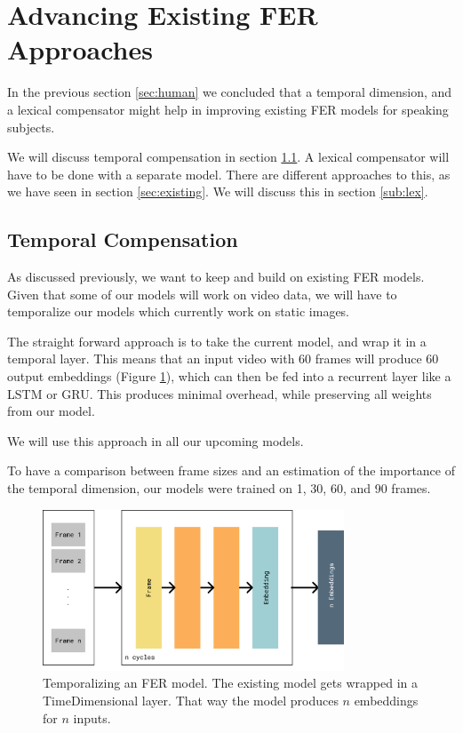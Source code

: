 \newpage
\section{Advancing Existing FER Approaches}
\label{sec:models}

In the previous section \ref{sec:human} we concluded that a temporal dimension, and a lexical compensator might help in improving existing FER models for speaking subjects. 

We will discuss temporal compensation in section \ref{sub:temp}. A lexical compensator will have to be done with a separate model. There are different approaches to this, as we have seen in section \ref{sec:existing}. We will discuss this in section \ref{sub:lex}.

\subsection{Temporal Compensation}
\label{sub:temp}
As discussed previously, we want to keep and build on existing FER models. Given that some of our models will work on video data, we will have to temporalize our models which currently work on static images.

The straight forward approach is to take the current model, and wrap it in a temporal layer. This means that an input video with 60 frames will produce 60 output embeddings (Figure \ref{fig:temporalization}), which can then be fed into a recurrent layer like a LSTM or GRU. This produces minimal overhead, while preserving all weights from our model.

We will use this approach in all our upcoming models.

To have a comparison between frame sizes and an estimation of the importance of the temporal dimension, our models were trained on 1, 30, 60, and 90 frames.

\begin{figure}
    \centering
    \includegraphics[width=0.8\textwidth]{res/temporalization.pdf}
    \caption{Temporalizing an FER model. The existing model gets wrapped in a TimeDimensional layer. That way the model produces $n$ embeddings for $n$ inputs.}
    \label{fig:temporalization}
\end{figure}

